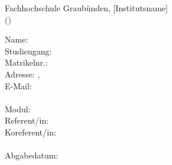 \begin{titlepage}
    
    \begin{center}
        Fachhochschule Graubünden, [Institutsname]
        \vfill
        \huge\textbf{\haupttitel}\\
        \large{(\untertitel)}
    \end{center}
    
    \vfill
    
    \begin{tabbing}
    Name: \autorenschaft\\
    Studiengang: \studiengang\\
    Matrikelnr.: \matrikelnummer\\
    Adresse: \adresse, \plz~\ort\\
    E-Mail: \email\\
    \\
    Modul: \modul\\
    Referent/in: \\
    Koreferent/in: \coRefe\\
    \\
    Abgabedatum: \abgabedatum
    \end{tabbing}
    
    \vfill
    

\end{titlepage}